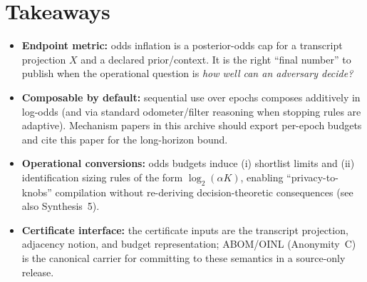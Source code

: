 \documentclass[11pt]{article}
\theoremstyle{definition}
\theoremstyle{remark}
\begin{document}
\section{Takeaways}
\begin{itemize}[leftmargin=*]
\item \textbf{Endpoint metric:} odds inflation is a posterior-odds cap for a transcript projection $X$ and a declared prior/context. It is the right ``final number'' to publish when the operational question is \emph{how well can an adversary decide?}
\item \textbf{Composable by default:} sequential use over epochs composes additively in log-odds (and via standard odometer/filter reasoning when stopping rules are adaptive). Mechanism papers in this archive should export per-epoch budgets and cite this paper for the long-horizon bound.
\item \textbf{Operational conversions:} odds budgets induce (i) shortlist limits and (ii) identification sizing rules of the form $\log_2(\alpha K)$, enabling ``privacy-to-knobs'' compilation without re-deriving decision-theoretic consequences (see also Synthesis~5).\cite{series:endpointbridge}
\item \textbf{Certificate interface:} the certificate inputs are the transcript projection, adjacency notion, and budget representation; ABOM/OINL (Anonymity~C) is the canonical carrier for committing to these semantics in a source-only release.\cite{series:abomoinl}
\end{itemize}
\end{document}
